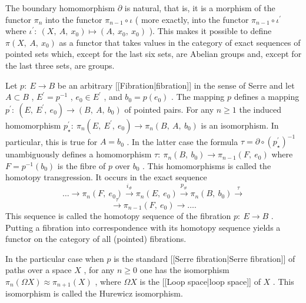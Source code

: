 The boundary homomorphism $  \partial $ 
is natural, that is, it is a morphism of the functor $  \pi _{n} $ 
into the functor $  \pi _{n-1} \circ \iota $ (
more exactly, into the functor $  \pi _{n-1} \circ \iota ^ \prime  $ 
where $  \iota ^ \prime  : \  ( X ,\  A ,\  x _{0} ) \mapsto ( A ,\  x _{0} ,\  x _{0} ) $ ). 
This makes it possible to define $  \pi ( X ,\  A ,\  x _{0} ) $ 
as a functor that takes values in the category of exact sequences of pointed sets which, except for the last six sets, are Abelian groups and, except for the last three sets, are groups.

Let $  p : \  E \rightarrow B $ 
be an arbitrary [[Fibration|fibration]] in the sense of Serre and let $  A \subset B $ , 
$  E ^ \prime  = p ^{-1} $ , 
$  e _{0} \in E ^ \prime  $ , 
and $  b _{0} = p ( e _{0} ) $ . 
The mapping $  p $ 
defines a mapping $  p ^ \prime  : \  ( E ,\  E ^ \prime  ,\  e _{0} ) \rightarrow ( B ,\  A ,\  b _{0} ) $ 
of pointed pairs. For any $  n \geq 1 $ 
the induced homomorphism $  p _ \star  ^ \prime  : \  \pi _{n} ( E ,\  E ^ \prime  ,\  e _{0} ) \rightarrow \pi _{n} ( B ,\  A ,\  b _{0} ) $ 
is an isomorphism. In particular, this is true for $  A = b _{0} $ . 
In the latter case the formula $  \tau = \partial \circ ( p _ \star  ^ \prime  ) ^{-1} $ 
unambiguously defines a homomorphism $  \tau : \  \pi _{n} ( B ,\  b _{0} ) \rightarrow \pi _{n-1} ( F ,\  e _{0} ) $ 
where $  F = p ^{-1} ( b _{0} ) $ 
is the fibre of $  p $ 
over $  b _{0} $ . 
This homomorphisms is called the homotopy transgression. It occurs in the exact sequence$$ 
{} \dots \rightarrow   \pi _{n} ( F ,\  e _{0} )  
 \stackrel{ {i _{\#}}} \rightarrow     \pi _{n}
( E ,\  e _{0} )    \stackrel{ {p _{\#}}} \rightarrow    
\pi _{n} ( B ,\  b _{0} )    \stackrel \tau  \rightarrow  
 $$ 
$$ 
 \stackrel \tau  \rightarrow     \pi _{n-1} ( F ,\  e _{0} )   \rightarrow \dots .
 $$ 
This sequence is called the homotopy sequence of the fibration $  p : \  E \rightarrow B $ . 
Putting a fibration into correspondence with its homotopy sequence yields a functor on the category of all (pointed) fibrations.

In the particular case when $  p $ 
is the standard [[Serre fibration|Serre fibration]] of paths over a space $  X $ , 
for any $  n \geq 0 $ 
one has the isomorphism $  \pi _{n} ( \Omega X ) \approx \pi _{n+1} (X) $ , 
where $  \Omega X $ 
is the [[Loop space|loop space]] of $  X $ . 
This isomorphism is called the Hurewicz isomorphism.

